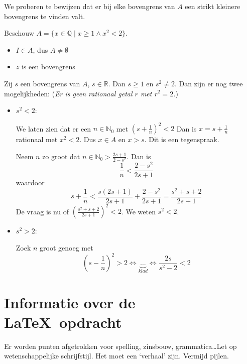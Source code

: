 \noindent We proberen te bewijzen dat er bij elke bovengrens van $A$ een strikt kleinere bovengrens te vinden valt.
\begin{bewijs}{}{}
    Beschouw \(A = \{ x \in \mathbb{Q} \mid x \geq 1 \land x^2 < 2\} \).
    \begin{itemize}
        \item \(I \in A\), dus \(A \neq \emptyset\) \checkmark
        \item \(z\) is een bovengrens \checkmark
    \end{itemize}

    Zij $s$ een bovengrens van $A$, \(s \in \mathbb{R}\).  Dan \(s\geq 1\) en \(s^2 \neq 2\). Dan zijn er nog twee mogelijkheden:
    (\textit{Er is geen rationaal getal $r$ met \(r^2=2\).})

    \begin{itemize}
        \item \(s^2<2\):

            We laten zien dat er een \(n\in\mathbb{N}_0\) met \({(s+\frac{1}{n})}^2<2\) Dan is \(x=s+\frac{1}{n}\) rationaal met \(x^2<2\). Dus \(x\in A \text{ en } x > s\). Dit is een tegenspraak.

            Neem $n$ zo groot dat \(n\in \mathbb{N}_0 > \frac{2s+1}{2-s^2}\). Dan is
            \[
                \frac{1}{n} < \frac{2-s^2}{2s+1}
            \]
            waardoor
            \[
                s + \frac{1}{n} < \frac{s(2s+1)}{2s+1} + \frac{2-s^2}{2s+1} = \frac{s^2+s+2}{2s+1}
            \]
            De vraag is nu of \({\left(\frac{s^2+s+2}{2s+1}\right)}^2 < 2\). We weten \(s^2<2\).

        \item \(s^2>2\):

            Zoek $n$ groot genoeg met
            \[
                {\left(s-\frac{1}{n}\right)}^2 > 2 \iff\underbrace{\dotsc}_{\textit{klad}} \iff \frac{2s}{s^2-2}<2
            \]
    \end{itemize}
\end{bewijs}


\section*{Informatie over de \LaTeX~opdracht}
Er worden punten afgetrokken voor spelling, zinsbouw, grammatica\ldots Let op wetenschappelijke schrijfstijl. Het moet een `verhaal' zijn. Vermijd pijlen.
